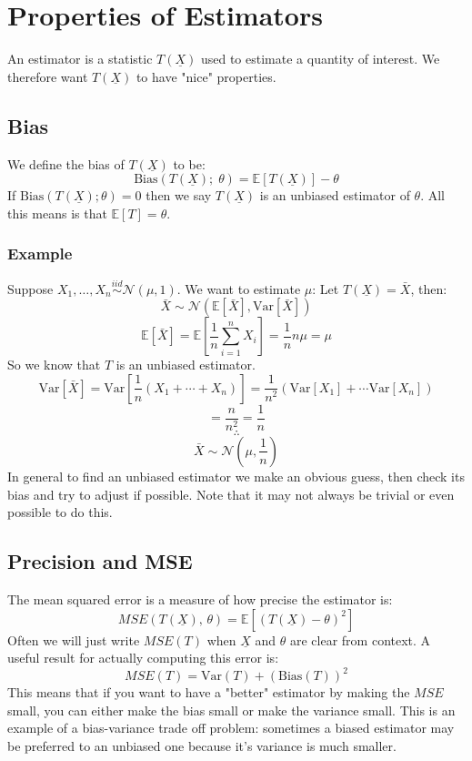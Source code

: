 \documentclass[12pt]{article}
\begin{document}
\section{Properties of Estimators}
An estimator is a statistic \(T(\underline{X})\) used to estimate a quantity of interest. We therefore want \(T(\underline{X})\) to have "nice" properties.
\subsection{Bias}
We define the bias of \(T(\underline{X})\) to be:
\[\text{Bias}(T(\underline{X});\;\theta)=\mathbb{E}[T(\underline{X})]-\theta\]
If \(\text{Bias}(T(\underline{X}); \theta)=0\) then we say \(T(\underline{X})\) is an unbiased estimator of \(\theta\). All this means is that \(\mathbb{E}[T]=\theta\).
\subsubsection*{Example}
Suppose \(X_1,\dots,X_n\overset{iid}{\sim}\mathcal{N}(\mu,1)\). We want to estimate \(\mu\): Let \(T(\underline{X})=\bar{X}\), then:
\[\bar{X}\sim \mathcal{N}(\mathbb{E}[\bar{X}], \text{Var}[\bar{X}])\]
\[\mathbb{E}[\bar{X}]=\mathbb{E}\left[\frac{1}{n}\sum^n_{i=1}X_i\right]=\frac{1}{n}n\mu=\mu\]
So we know that \(T\) is an unbiased estimator.
\[\text{Var}[\bar{X}]=\text{Var}\left[\frac{1}{n}(X_1+\cdots+X_n)\right]=\frac{1}{n^2}(\text{Var}[X_1]+\cdots\text{Var}[X_n])\]
\[=\frac{n}{n^2}=\frac{1}{n}\]
\[\therefore\]
\[\bar{X}\sim\mathcal{N}\left(\mu,\frac{1}{n}\right)\]
In general to find an unbiased estimator we make an obvious guess, then check its bias and try to adjust if possible. Note that it may not always be trivial or even possible to do this.
\subsection{Precision and MSE}
The mean squared error is a measure of how precise the estimator is:
\[MSE(T(\underline{X}),\,\theta)=\mathbb{E}[(T(\underline{X})-\theta)^2]\]
Often we will just write \(MSE(T)\) when \(\underline{X}\) and \(\theta\) are clear from context. A useful result for actually computing this error is:
\[MSE(T)=\text{Var}(T)+(\text{Bias}(T))^2\]
This means that if you want to have a "better" estimator by making the \(MSE\) small, you can either make the bias small or make the variance small. This is an example of a bias-variance trade off problem: sometimes a biased estimator may be preferred to an unbiased one because it's variance is much smaller.
\end{document}
